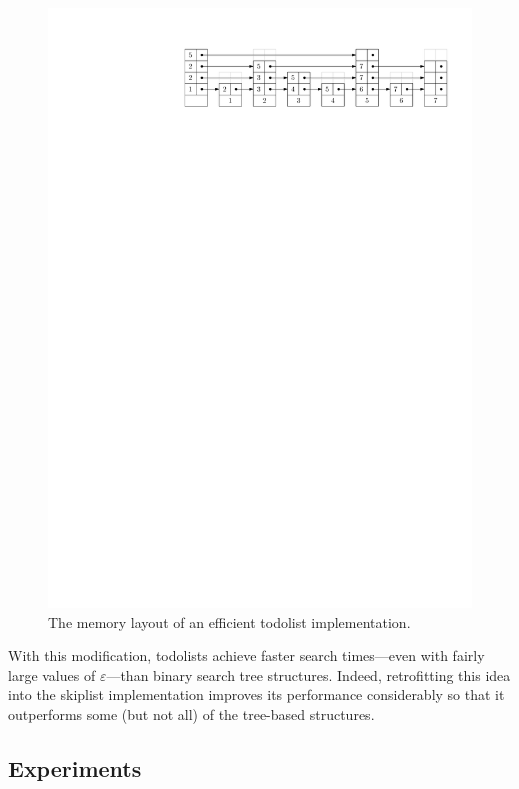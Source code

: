 \documentclass{patmorin}
\newcommand{\eps}{\varepsilon}
\begin{document}
\begin{figure}
   \centerline{\includegraphics{packed-in}}
   \caption{The memory layout of an efficient todolist implementation.}
\end{figure}

With this modification, todolists achieve faster search times---even with
fairly large values of $\eps$---than binary search tree structures. Indeed,
retrofitting this idea into the skiplist implementation improves its
performance considerably so that it outperforms some (but not all)
of the tree-based structures.

\subsection{Experiments}
\end{document}
